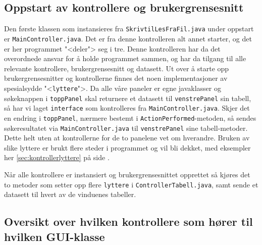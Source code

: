 \subsection{Oppstart av kontrollere og brukergrensesnitt}
Den første klassen som instansieres fra \texttt{SkrivtilLesFraFil.java} under oppstart er \texttt{MainController.java}.
Det er fra denne kontrolleren alt annet starter, og det er her programmet "<deler"> seg i tre. 
Denne kontrolleren har da det overordnede ansvar for å holde programmet sammen, og har da tilgang til alle relevante kontrollere, brukergrensesnitt og datasett. 
Ut over å starte opp brukergrensesnitter og kontrollerne finnes det noen implementasjoner av spesialsydde "<\texttt{lyttere}">. 
Da alle våre paneler er egne javaklasser og søkeknappen i \texttt{toppPanel} skal returnere et datasett til \texttt{venstrePanel} sin tabell, så har vi laget \texttt{interface} som kontrolleres fra \texttt{MainController.java}. Skjer det en endring i \texttt{toppPanel}, nærmere bestemt i \texttt{ActionPerformed}-metoden, så sendes søkeresultatet via \texttt{MainController.java} til \texttt{venstrePanel} sine tabell-metoder. Dette helt uten at kontrollerne for de to panelene vet om hverandre.
Bruken av slike lyttere er brukt flere steder i programmet og vil bli dekket, med eksempler her \ref{sec:kontrollerlyttere} på side \pageref{sec:kontrollerlyttere}.

Når alle kontrollere er instansiert og brukergrensesnittet opprettet så kjøres det to metoder som setter opp flere \texttt{lyttere} i \texttt{ControllerTabell.java}, samt sende et datasett til hvert av de vinduenes tabeller.



\newpage
\subsection{Oversikt over hvilken kontrollere som hører til hvilken GUI-klasse}


